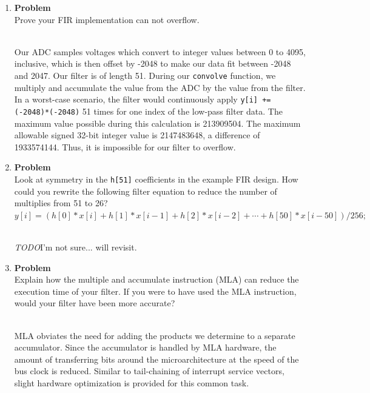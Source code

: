 \documentclass[12pt]{article}
\newenvironment{Ex}{\textbf{Problem}\vspace{.25em}\\}{}
\newcommand{\todo}{{\LARGE \emph{\color{red}TODO}}}
\newcommand{\hbr}{\hfill\vspace{.25em}\\}
\begin{document}
\begin{enumerate}[1)]
\begin{Ex}
    Can you estimate jitter in your ADC samples?
    \begin{solution} \hbr
      No, we did not implement jitter calculation in this lab. There
      should be little to no jitter, as timers are utlized to provide
      adc triggering and each interrupt service routine takes a
      consisten amount of time regardless of the data the ADC is
      sampling. Care was taken to make sure that the ISRs take an
      equal amount of time for this purpose.
    \end{solution}
  \end{Ex}
\item
  \begin{Ex}
    Prove your FIR implementation can not overflow.
    \begin{solution} \hbr
      Our ADC samples voltages which convert to integer values between
      0 to 4095, inclusive, which is then offset by -2048 to make our
      data fit between -2048 and 2047. Our filter is of length
      51. During our \verb|convolve| function, we multiply and
      accumulate the value from the ADC by the value from the
      filter. In a worst-case scenario, the filter would continuously
      apply \verb|y[i] += (-2048)*(-2048)| 51 times for one index of
      the low-pass filter data. The maximum value possible during this
      calculation is 213909504. The maximum allowable signed 32-bit
      integer value is 2147483648, a difference of 1933574144. Thus,
      it is impossible for our filter to overflow.
    \end{solution}
  \end{Ex}
\item
  \begin{Ex}
    Look at symmetry in the \verb|h[51]| coefficients in the example
    FIR design. How could you rewrite the following filter equation to
    reduce the number of multiplies from 51 to 26?
    $y[i]=(h[0]*x[i]+h[1]*x[i-1]+h[2]*x[i-2]+\cdots+h[50]*x[i-50])/256;$
    \begin{solution} \hbr
      \todo I'm not sure... will revisit.
    \end{solution}
  \end{Ex}
\item
  \begin{Ex}
    Explain how the multiple and accumulate instruction (MLA) can
    reduce the execution time of your filter. If you were to have used
    the MLA instruction, would your filter have been more accurate?

    \begin{solution} \hbr
      MLA obviates the need for adding the products we determine to a
      separate accumulator. Since the accumulator is handled by MLA
      hardware, the amount of transferring bits around the
      microarchitecture at the speed of the bus clock is reduced. Similar
      to tail-chaining of interrupt service vectors, slight hardware
      optimization is provided for this common task.


\end{solution}
\end{Ex}
\end{enumerate}
\end{document}
